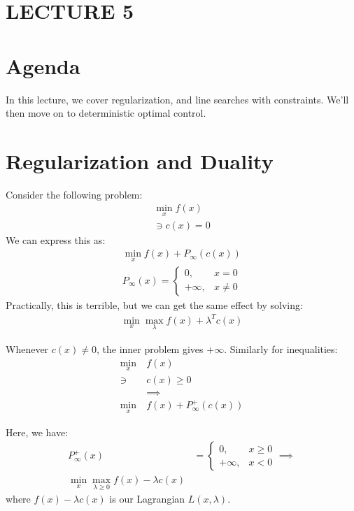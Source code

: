 \newpage
\section{LECTURE 5}

\section{Agenda}
In this lecture, we cover regularization, and line searches with constraints. We'll then move on to deterministic optimal control. 

\section{Regularization and Duality}
Consider the following problem: 
\begin{align}
    \min_x f(x) \\
    \ni c(x) = 0
\end{align}
We can express this as: 
\begin{align}
    \min_x f(x) + P_{\infty} (c(x)) \\
    P_{\infty} (x) = \begin{cases}
0, & x=0 \\
+ \infty, & x \neq 0 
\end{cases}
\end{align}
Practically, this is terrible, but we can get the same effect by solving:
\begin{align}
    \min_x \max_{\lambda} f(x) + \lambda^T c(x) 
\end{align}

\noindent
Whenever $c(x) \neq 0$, the inner problem gives $+\infty$. 
Similarly for inequalities: 
\begin{align}
    \min_x \ &f(x) \\
    \ni \ &c(x) \geq 0 \\
    &\implies \\
    \min_x \ &f(x) + P_{\infty}^+ (c(x))
\end{align}

\noindent
Here, we have: 
\begin{align}
    P_{\infty}^+ (x) &= \begin{cases}
0, & x \geq 0 \\
+ \infty, & x < 0 
\end{cases}
\implies \\ 
\min_x \max_{\lambda \geq 0} f(x) - \lambda c(x) 
\end{align}
where $f(x) - \lambda c(x)$ is our Lagrangian $L(x,\lambda)$.\\

